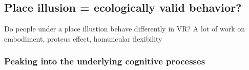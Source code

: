 \subsection{Place illusion = ecologically valid behavior?}

Do people under a place illustion behave differently in VR?
A lot of work on embodiment, proteus effect, homuncular flexibility \cite{Banakou2013, Yee2007, Maister2015}


\subsubsection{Peaking into the underlying cognitive processes}
